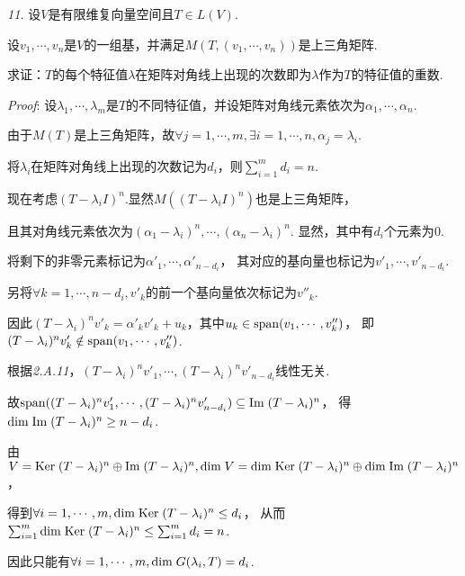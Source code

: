 \hspace*{\fill}

\textit{11.}
设\(V\)是有限维复向量空间且\(T \in L(V)\).

设\(v_1,\cdots,v_n\)是\(V\)的一组基，并满足\(M(T,(v_1,\cdots,v_n))\)是上三角矩阵.

求证：\(T\)的每个特征值\(\lambda\)在矩阵对角线上出现的次数即为\(\lambda\)作为\(T\)的特征值的重数.

\textit{Proof}:
设\(\lambda_1,\cdots,\lambda_m\)是\(T\)的不同特征值，并设矩阵对角线元素依次为\(\alpha_1,\cdots,\alpha_n\).

由于\(M(T)\)是上三角矩阵，故\(\forall j=1,\cdots,m,\exists i=1,\cdots,n,\alpha_j=\lambda_i\).

将\(\lambda_i\)在矩阵对角线上出现的次数记为\(d_i\)，则\(\sum_{i=1}^m d_i=n\).

现在考虑\((T-\lambda_i I)^n\).显然\(M((T-\lambda_i I)^n)\)也是上三角矩阵，

且其对角线元素依次为\((\alpha_1-\lambda_i)^n,\cdots,(\alpha_n-\lambda_i)^n\).
显然，其中有\(d_i\)个元素为\(0\).

将剩下的非零元素标记为\(\alpha'_1,\cdots,\alpha'_{n-d_i}\)，
其对应的基向量也标记为\(v'_1,\cdots,v'_{n-d_i}\).

另将\(\forall k=1,\cdots,n-d_i,v'_k\)的前一个基向量依次标记为\(v''_k\).

因此\((T-\lambda_i)^n v'_k=\alpha'_kv'_k+u_k\)，其中\(u_k \in \mathrm{span} (v_1,\cdots,v''_k)\)，
即\((T-\lambda_i)^n v'_k \notin \mathrm{span} (v_1,\cdots,v''_k)\).

根据\textit{2.A.11}，\((T-\lambda_i)^n v'_1,\cdots,(T-\lambda_i)^n v'_{n-d_i}\)线性无关.

故\(\mathrm{span} ((T-\lambda_i)^n v'_1,\cdots,(T-\lambda_i)^n v'_{n-d_i}) \subseteq \mathrm{Im \;} (T-\lambda_i)^n\)，
得\(\mathrm{dim \;} \mathrm{Im \;} (T-\lambda_i)^n \geq n-d_i\).

由$V=\mathrm{Ker \;} (T-\lambda_i)^n \oplus \mathrm{Im \;} (T-\lambda_i)^n,
\mathrm{dim \;} V=\mathrm{dim \;} \mathrm{Ker \;} (T-\lambda_i)^n \oplus \mathrm{dim \;} \mathrm{Im \;} (T-\lambda_i)^n$，

得到\(\forall i=1,\cdots,m,\mathrm{dim \;} \mathrm{Ker \;} (T-\lambda_i)^n \leq d_i\)，
从而\(\sum_{i=1}^m \mathrm{dim \;} \mathrm{Ker \;} (T-\lambda_i)^n \leq \sum_{i=1}^m d_i=n\).

因此只能有\(\forall i=1,\cdots,m,\mathrm{dim \;} G(\lambda_i,T)=d_i\).

